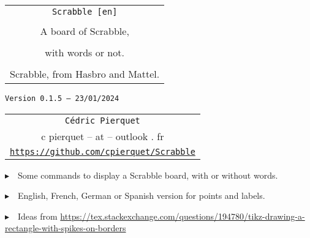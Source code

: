 \documentclass{article}
\def\TPversion{0.1.5}
\def\TPdate{23/01/2024}
\begin{document}
\pagestyle{fancy}

\thispagestyle{empty}

\vspace{2cm}

\begin{center}
	\begin{minipage}{0.75\linewidth}
	\begin{tcolorbox}[colframe=yellow,colback=yellow!15]
		\begin{center}
			\begin{tabular}{c}
				{\Huge \texttt{Scrabble [en]}}\\
				\\
				{\LARGE A board of Scrabble,} \\
				\\
				{\LARGE with words or not.} \\
				\\
				{Scrabble\texttrademark{}, from Hasbro\texttrademark{} and Mattel\texttrademark{}.}
			\end{tabular}
			
			\medskip
			
			{\small \texttt{Version \TPversion{} -- \TPdate}}
		\end{center}
	\end{tcolorbox}
\end{minipage}
\end{center}

\vspace{0.5cm}

\begin{center}
	\begin{tabular}{c}
	\texttt{Cédric Pierquet}\\
	{\ttfamily c pierquet -- at -- outlook . fr}\\
	\texttt{\url{https://github.com/cpierquet/Scrabble}}
\end{tabular}
\end{center}

\vspace{0.5cm}

{$\blacktriangleright$~~Some commands to display a Scrabble board, with or without words.}

\smallskip

{$\blacktriangleright$~~English, French, German or Spanish version for points and labels.}

\smallskip

{$\blacktriangleright$~~Ideas from \url{https://tex.stackexchange.com/questions/194780/tikz-drawing-a-rectangle-with-spikes-on-borders}}
\end{document}
